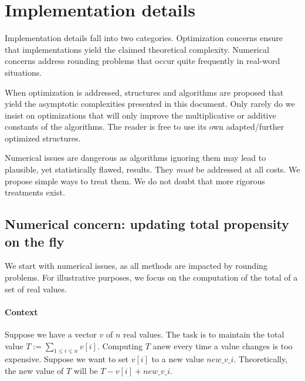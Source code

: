 
\section{Implementation details}
\label{sec:implementation_details}

Implementation details fall into two categories. Optimization concerns ensure that implementations yield the claimed theoretical complexity. Numerical concerns address rounding problems that occur quite frequently in real-word situations.

When optimization is addressed, structures and algorithms are proposed that yield the asymptotic complexities presented in this document. Only rarely do we insist on optimizations that will only improve the multiplicative or additive constants of the algorithms. The reader is free to use its own adapted/further optimized structures.

Numerical issues are dangerous as algorithms ignoring them may lead to plausible, yet statistically flawed, results. They \emph{must} be addressed at all costs. We propose simple ways to treat them. We do not doubt that more rigorous treatments exist.

\subsection{Numerical concern: updating total propensity on the fly}
\label{ssec:total_numerical}
We start with numerical issues, as all methods are impacted by rounding problems. For illustrative purposes, we focus on the computation of the total of a set of real values.

\paragraph{Context} Suppose we have a vector $v$ of $n$ real values. The task is to maintain the total value $T := \sum_{1\leq i\leq n}v[i]$. Computing $T$ anew every time a value changes is too expensive. Suppose we want to set $v[i]$ to a new value $new\_v\_i$. Theoretically, the new value of $T$ will be $T - v[i] + new\_v\_i$. 


